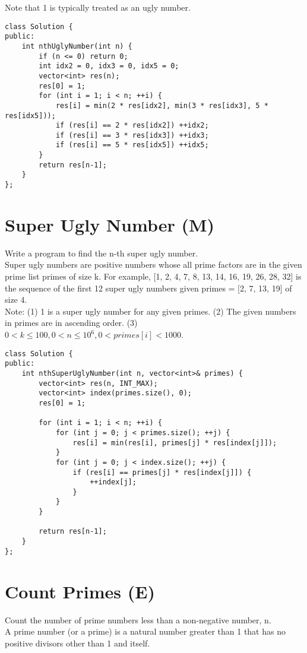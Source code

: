 Note that 1 is typically treated as an ugly number. \\

\begin{lstlisting}
class Solution {
public:
    int nthUglyNumber(int n) {
        if (n <= 0) return 0;
        int idx2 = 0, idx3 = 0, idx5 = 0;
        vector<int> res(n);
        res[0] = 1;
        for (int i = 1; i < n; ++i) {
            res[i] = min(2 * res[idx2], min(3 * res[idx3], 5 * res[idx5]));
            if (res[i] == 2 * res[idx2]) ++idx2;
            if (res[i] == 3 * res[idx3]) ++idx3;
            if (res[i] == 5 * res[idx5]) ++idx5;
        }
        return res[n-1];
    }
};
\end{lstlisting}


\section{Super Ugly Number (M)}
Write a program to find the n-th super ugly number.\\

Super ugly numbers are positive numbers whose all prime factors are in the given prime list primes of size k. For example, [1, 2, 4, 7, 8, 13, 14, 16, 19, 26, 28, 32] is the sequence of the first 12 super ugly numbers given primes = [2, 7, 13, 19] of size 4.\\

Note:
(1) 1 is a super ugly number for any given primes.
(2) The given numbers in primes are in ascending order.
(3) $0 < k \leq 100, 0 < n \leq 10^6, 0 < primes[i] < 1000$. \\

\begin{lstlisting}
class Solution {
public:
    int nthSuperUglyNumber(int n, vector<int>& primes) {
        vector<int> res(n, INT_MAX);
        vector<int> index(primes.size(), 0);
        res[0] = 1;
        
        for (int i = 1; i < n; ++i) {
            for (int j = 0; j < primes.size(); ++j) {
                res[i] = min(res[i], primes[j] * res[index[j]]);
            }
            for (int j = 0; j < index.size(); ++j) {
                if (res[i] == primes[j] * res[index[j]]) {
                    ++index[j];
                }
            }
        }
        
        return res[n-1];
    }
};
\end{lstlisting}


\section{Count Primes (E)}
Count the number of prime numbers less than a non-negative number, n. \\
A prime number (or a prime) is a natural number greater than 1 that has no positive divisors other than 1 and itself. \\

